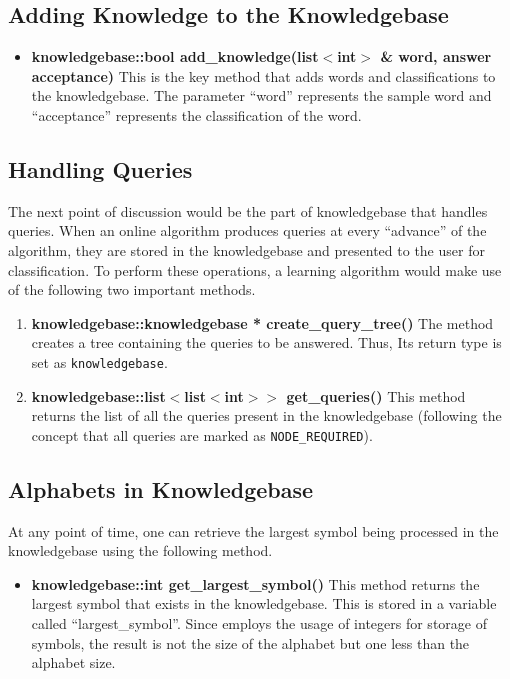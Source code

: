 \subsection*{Adding Knowledge to the Knowledgebase} 

\begin{itemize}
\item \textbf{knowledgebase::bool add\_knowledge(list$<$int$>$ \& word, answer acceptance)} \vskip 1pt
	This is the key method that adds words and classifications to the knowledgebase. The parameter ``word'' represents the sample word and ``acceptance'' represents the classification of the word. 
\end{itemize}	

\subsection*{Handling Queries}
	The next point of discussion would be the part of knowledgebase that handles queries. When an online algorithm produces queries at every ``advance'' of the algorithm, they are stored in the knowledgebase and presented to the user for classification. To perform these operations, a learning algorithm would make use of the following two important methods.

\begin{enumerate}
\item \textbf{knowledgebase::knowledgebase * create\_query\_tree()} \vskip 1pt
	The method creates a tree containing the queries to be answered. Thus, Its return type is set as \texttt{knowledgebase}.
	
\item \textbf{knowledgebase::list$<$list$<$int$>$$>$ get\_queries()} \vskip 1pt
	This method returns the list of all the queries present in the knowledgebase (following the concept that all queries are marked as \texttt{NODE\_REQUIRED}). 
\end{enumerate}

\subsection*{Alphabets in Knowledgebase}
	At any point of time, one can retrieve the largest symbol being processed in the knowledgebase using the following method.
\begin{itemize}
\item \textbf{knowledgebase::int get\_largest\_symbol()} \vskip 1pt 
	This method returns the largest symbol that exists in the knowledgebase. This is stored in a variable called ``largest\_symbol''. Since \libalf employs the usage of integers for storage of symbols, the result is not the size of the alphabet but one less than the alphabet size.
\end{itemize}	

